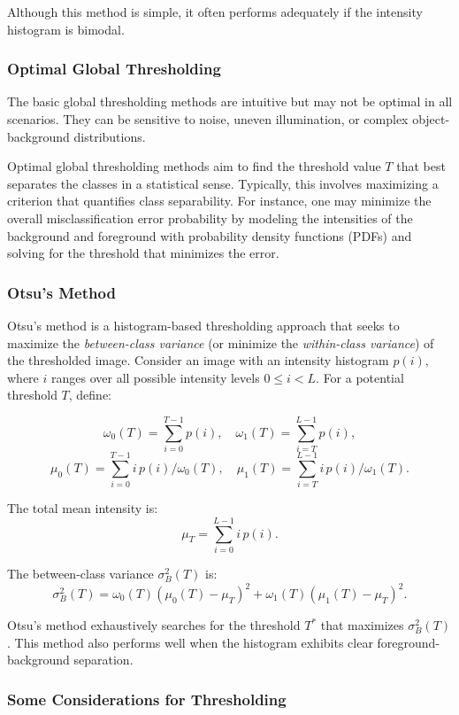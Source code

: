 \documentclass[a4paper,12pt]{article}
\begin{document}
Although this method is simple, it often performs adequately if the intensity histogram is bimodal.

\subsubsection{Optimal Global Thresholding}

The basic global thresholding methods are intuitive but may not be optimal in all scenarios. They can be sensitive to noise, uneven illumination, or complex object-background distributions.

Optimal global thresholding methods aim to find the threshold value \(T\) that best separates the classes in a statistical sense. Typically, this involves maximizing a criterion that quantifies class separability. For instance, one may minimize the overall misclassification error probability by modeling the intensities of the background and foreground with probability density functions (PDFs) and solving for the threshold that minimizes the error.

\subsubsection{Otsu's Method}

Otsu's method is a histogram-based thresholding approach that seeks to maximize the \emph{between-class variance} (or minimize the \emph{within-class variance}) of the thresholded image. Consider an image with an intensity histogram \(p(i)\), where \(i\) ranges over all possible intensity levels \(0 \leq i < L\). For a potential threshold \(T\), define:

\[
\omega_0(T) = \sum_{i=0}^{T-1} p(i), 
\quad
\omega_1(T) = \sum_{i=T}^{L-1} p(i),
\]
\[
\mu_0(T) = \sum_{i=0}^{T-1} i \, p(i) / \omega_0(T), 
\quad
\mu_1(T) = \sum_{i=T}^{L-1} i \, p(i) / \omega_1(T).
\]

The total mean intensity is:
\[
\mu_T = \sum_{i=0}^{L-1} i \, p(i).
\]

The between-class variance \(\sigma_B^2(T)\) is:
\[
\sigma_B^2(T) = \omega_0(T) \left( \mu_0(T) - \mu_T \right)^2 
+ \omega_1(T) \left( \mu_1(T) - \mu_T \right)^2.
\]

Otsu's method exhaustively searches for the threshold \(T^*\) that maximizes \(\sigma_B^2(T)\). This method also performs well when the histogram exhibits clear foreground-background separation.

\subsubsection{Some Considerations for Thresholding}
\end{document}
